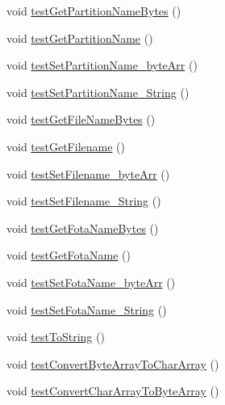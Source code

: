 \begin{DoxyCompactItemize}
\item 
void \hyperlink{class_c_a_s_u_a_l_1_1archiving_1_1libpit_1_1_pit_entry_test_ad65cfab0db84145d602e044ebe70c38d}{test\-Get\-Partition\-Name\-Bytes} ()
\item 
void \hyperlink{class_c_a_s_u_a_l_1_1archiving_1_1libpit_1_1_pit_entry_test_a41a892fac2e3830201c8ee8742328dd6}{test\-Get\-Partition\-Name} ()
\item 
void \hyperlink{class_c_a_s_u_a_l_1_1archiving_1_1libpit_1_1_pit_entry_test_a1a157659b5634814096c2c5ffdd43ded}{test\-Set\-Partition\-Name\-\_\-byte\-Arr} ()
\item 
void \hyperlink{class_c_a_s_u_a_l_1_1archiving_1_1libpit_1_1_pit_entry_test_af7c9086de89f4a3b42075a7883229edf}{test\-Set\-Partition\-Name\-\_\-\-String} ()
\item 
void \hyperlink{class_c_a_s_u_a_l_1_1archiving_1_1libpit_1_1_pit_entry_test_aa7160a596712ac7970e099fb7f412467}{test\-Get\-File\-Name\-Bytes} ()
\item 
void \hyperlink{class_c_a_s_u_a_l_1_1archiving_1_1libpit_1_1_pit_entry_test_a969d85946542c81609b263b22605dc80}{test\-Get\-Filename} ()
\item 
void \hyperlink{class_c_a_s_u_a_l_1_1archiving_1_1libpit_1_1_pit_entry_test_a51ed5c9497a20dbc7919c485754192cc}{test\-Set\-Filename\-\_\-byte\-Arr} ()
\item 
void \hyperlink{class_c_a_s_u_a_l_1_1archiving_1_1libpit_1_1_pit_entry_test_ae5ef720f553c58f06e218101fc1b90d7}{test\-Set\-Filename\-\_\-\-String} ()
\item 
void \hyperlink{class_c_a_s_u_a_l_1_1archiving_1_1libpit_1_1_pit_entry_test_ac5b132b75d7a9ca6ca4ea0636cc86b57}{test\-Get\-Fota\-Name\-Bytes} ()
\item 
void \hyperlink{class_c_a_s_u_a_l_1_1archiving_1_1libpit_1_1_pit_entry_test_afb2bfcf15987c221f3cb0c33bb48eba3}{test\-Get\-Fota\-Name} ()
\item 
void \hyperlink{class_c_a_s_u_a_l_1_1archiving_1_1libpit_1_1_pit_entry_test_a952d90ef3b2afa8976c3c2e70be7a2fe}{test\-Set\-Fota\-Name\-\_\-byte\-Arr} ()
\item 
void \hyperlink{class_c_a_s_u_a_l_1_1archiving_1_1libpit_1_1_pit_entry_test_ae03349cb60c30d2a7ccd06f4f3a16771}{test\-Set\-Fota\-Name\-\_\-\-String} ()
\item 
void \hyperlink{class_c_a_s_u_a_l_1_1archiving_1_1libpit_1_1_pit_entry_test_ae90fd0a8ad37b95eac06c93804c6ce29}{test\-To\-String} ()
\item 
void \hyperlink{class_c_a_s_u_a_l_1_1archiving_1_1libpit_1_1_pit_entry_test_a4067db1e45c315476970e0d9c0ea0477}{test\-Convert\-Byte\-Array\-To\-Char\-Array} ()
\item 
void \hyperlink{class_c_a_s_u_a_l_1_1archiving_1_1libpit_1_1_pit_entry_test_aed669209ec4c036e23c4afa978074b72}{test\-Convert\-Char\-Array\-To\-Byte\-Array} ()
\end{DoxyCompactItemize}
